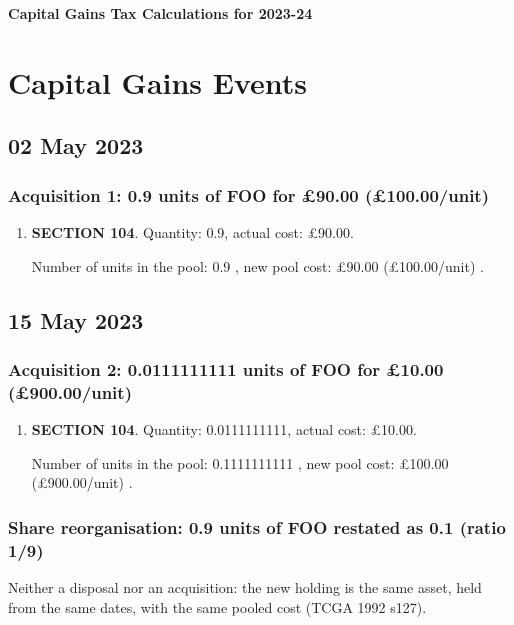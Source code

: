 \documentclass{article}
\begin{document}
\centerline{\Large\bfseries Capital Gains Tax Calculations for 2023-24}

\section*{Capital Gains Events}


\subsection*{02 May 2023}
\subsubsection*{
    Acquisition 1: 0.9 units of FOO for £90.00
    (£100.00/unit)%
}

\begin{enumerate}
\item \textbf{SECTION 104}. Quantity: 0.9,
    actual cost: £90.00.

    Number of units in the pool:
    0.9%
,
    new pool cost: £90.00
    (£100.00/unit)%
.

\end{enumerate}



\subsection*{15 May 2023}
\subsubsection*{
    Acquisition 2: 0.0111111111 units of FOO for £10.00
    (£900.00/unit)%
}

\begin{enumerate}
\item \textbf{SECTION 104}. Quantity: 0.0111111111,
    actual cost: £10.00.

    Number of units in the pool:
    0.1111111111%
,
    new pool cost: £100.00
    (£900.00/unit)%
.

\end{enumerate}

\subsubsection*{
    Share reorganisation: 0.9 units of FOO restated as 0.1 (ratio 1/9)
}
Neither a disposal nor an acquisition: the new holding is the same asset, held from the same dates, with the same pooled cost (TCGA 1992 s127).
\end{document}
